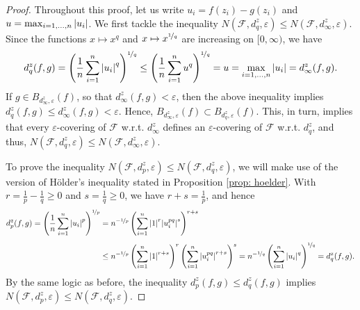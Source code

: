 \begin{proof}
Throughout this proof, let us write $u_i = f(z_i) - g(z_i)$ and $u = \max_{i=1, \dots, n} \abs{u_i}$. We first tackle the inequality $N(\mathcal{F}, d_q^z, \varepsilon) \leq N(\mathcal{F}, d_{\infty}^z, \varepsilon)$. Since the functions $x \mapsto x^q$ and $x \mapsto x^{\nicefrac{1}{q}}$ are increasing on $[0, \infty)$, we have
\[
    d_q^z(f, g) = \left( \frac{1}{n} \sum_{i=1}^n \abs{u_i}^q \right)^{\nicefrac{1}{q}} \leq \left( \frac{1}{n} \sum_{i=1}^n u^q \right)^{\nicefrac{1}{q}} = u = \max_{i=1, \dots, n} \abs{u_i} = d_{\infty}^z(f, g).
\]
If $g \in B_{d_{\infty}^z, \varepsilon}(f)$, so that $d_{\infty}^z(f, g) < \varepsilon$, then the above inequality implies $d_q^z(f, g) \leq d_{\infty}^z(f, g) < \varepsilon$. Hence, $B_{d_{\infty}^z, \varepsilon}(f) \subset B_{d_q^z, \varepsilon}(f)$. This, in turn, implies that every $\varepsilon$-covering of $\mathcal{F}$ w.r.t. $d_{\infty}^z$ defines an $\varepsilon$-covering of $\mathcal{F}$ w.r.t. $d_q^z$, and thus, $N(\mathcal{F}, d_q^z, \varepsilon) \leq N(\mathcal{F}, d_{\infty}^z, \varepsilon)$.

To prove the inequality $N(\mathcal{F}, d_p^z, \varepsilon) \leq N(\mathcal{F}, d_q^z, \varepsilon)$, we will make use of the version of H{\"o}lder's inequality stated in Proposition \ref{prop: hoelder}. With $r = \frac{1}{p} - \frac{1}{q} \geq 0$ and $s = \frac{1}{q} \geq 0$, we have $r + s = \frac{1}{p}$, and hence
\begin{align*}
    d_p^z(f, g) = \left( \frac{1}{n} \sum_{i=1}^n \abs{u_i}^p \right)^{\nicefrac{1}{p}} &= n^{-\nicefrac{1}{p}} \left( \sum_{i=1}^n \abs{1}^r \abs{u_i^{pq}}^s \right)^{r+s} \\[4pt]
        &\leq n^{-\nicefrac{1}{p}} \left( \sum_{i=1}^n \abs{1}^{r+s} \right)^r \left( \sum_{i=1}^n \abs{u_i^{pq}}^{r+s} \right)^s = n^{-\nicefrac{1}{q}} \left( \sum_{i=1}^n \abs{u_i}^{q} \right)^{\nicefrac{1}{q}} = d_q^z(f, g).
\end{align*}
By the same logic as before, the inequality $d_p^z(f, g) \leq d_q^z(f, g)$ implies $N(\mathcal{F}, d_p^z, \varepsilon) \leq N(\mathcal{F}, d_q^z, \varepsilon)$.
\end{proof}

